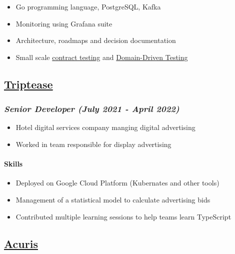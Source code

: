 \begin{itemize}
\tightlist
\item
  Go programming language, PostgreSQL, Kafka
\item
  Monitoring using Grafana suite
\item
  Architecture, roadmaps and decision documentation
\item
  Small scale
  \href{https://martinfowler.com/bliki/ContractTest.html}{contract
  testing} and
  \href{http://www.natpryce.com/articles/000819.html}{Domain-Driven
  Testing}
\end{itemize}

\subsection{\texorpdfstring{\href{https://www.triptease.com/}{Triptease}}{Triptease}}\label{triptease}

\subsubsection{\texorpdfstring{\emph{Senior Developer (July 2021 - April
2022)}}{Senior Developer (July 2021 - April 2022)}}\label{senior-developer-july-2021---april-2022}

\begin{itemize}
\tightlist
\item
  Hotel digital services company manging digital advertising
\item
  Worked in team responsible for display advertising
\end{itemize}

\paragraph{Skills}\label{skills-triptease}

\begin{itemize}
\tightlist
\item
  Deployed on Google Cloud Platform (Kubernates and other tools)
\item
  Management of a statistical model to calculate advertising bids
\item
  Contributed multiple learning sessions to help teams learn TypeScript
\end{itemize}

\subsection{\texorpdfstring{\href{http://www.acuris.com/}{Acuris}}{Acuris}}\label{acuris}

